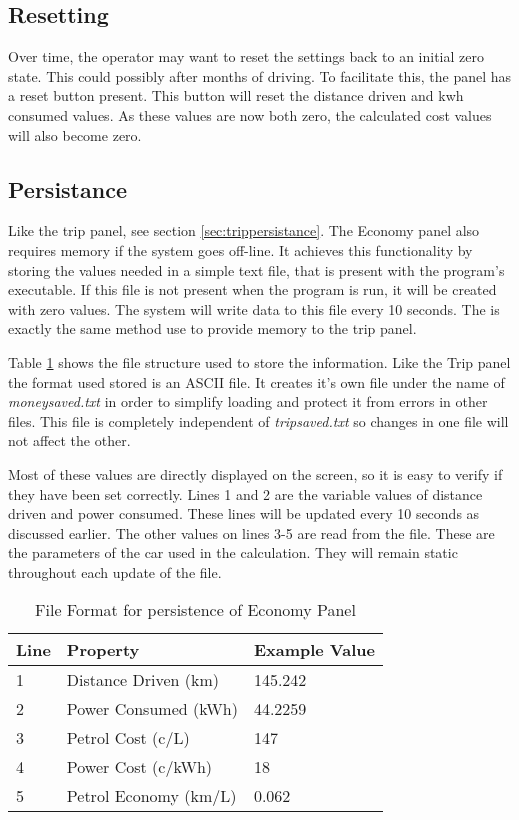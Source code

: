 \subsection{Resetting}

Over time, the operator may want to reset the settings back to an initial zero state. This could possibly after months of driving. To facilitate this, the panel has a reset button present. This button will reset the distance driven and kwh consumed values. As these values are now both zero, the calculated cost values will also become zero.

\subsection{Persistance}

Like the trip panel, see section \ref{sec:trippersistance}. The Economy panel also requires memory if the system goes off-line.  It achieves this functionality by storing the values needed in a simple text file, that is present with the program's executable. If this file is not present when the program is run, it will be created with zero values. The system will write data to this file every 10 seconds. The is exactly the same method use to provide memory to the trip panel.

Table \ref{tab:economyformat} shows the file structure used to store the information. Like the Trip panel the format used  stored is an ASCII file.  It creates it's own file under the name of \emph{moneysaved.txt} in order to simplify loading and protect it from errors in other files. This file is completely independent of \emph{tripsaved.txt} so changes in one file will not affect the other.

Most of these values are directly displayed on the screen, so it is easy to verify if they have been set correctly. Lines 1 and 2 are the variable values of distance driven and power consumed. These lines will be updated every 10 seconds as discussed earlier. The other values on lines 3-5 are read from the file. These are the parameters of the car used in the calculation. They will remain static throughout each update of the file.

\begin{table}
\begin{center}
    \begin{tabular}{|l|l|l|}
        \hline
        Line & Property              & Example Value \\ \hline
        1    & Distance Driven (km)  & 145.242       \\ 
        2    & Power Consumed (kWh)  & 44.2259       \\ 
        3    & Petrol Cost (c/L)     & 147           \\ 
        4    & Power Cost (c/kWh)    & 18            \\ 
        5    & Petrol Economy (km/L) & 0.062         \\
        \hline
    \end{tabular}
	\caption{File Format for persistence of Economy Panel}
	\label{tab:economyformat}
\end{center}
\end{table}




